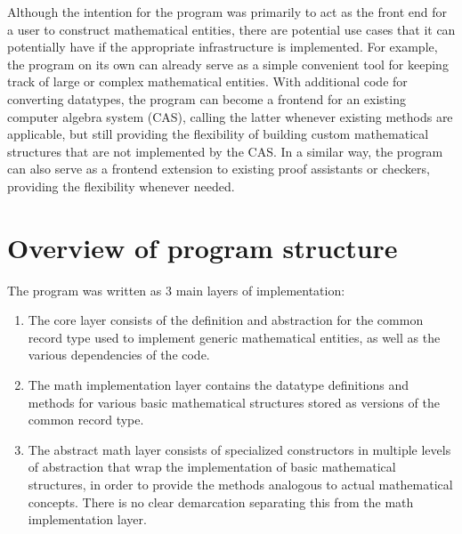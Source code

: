 \documentclass{article}
\begin{document}
        Although the intention for the program was primarily to act as the front end for a user to construct mathematical entities, there are potential use cases that it can potentially have if the appropriate infrastructure is implemented. For example, the program on its own can already serve as a simple convenient tool for keeping track of large or complex mathematical entities. With additional code for converting datatypes, the program can become a frontend for an existing computer algebra system (CAS), calling the latter whenever existing methods are applicable, but still providing the flexibility of building custom mathematical structures that are not implemented by the CAS. In a similar way, the program can also serve as a frontend extension to existing proof assistants or checkers, providing the flexibility whenever needed.
    
    
    \section{Overview of program structure}
        
        The program was written as 3 main layers of implementation:
        \begin{enumerate}[1.]
            \item The core layer consists of the definition and abstraction for the common record type used to implement generic mathematical entities, as well as the various dependencies of the code.
            \item The math implementation layer contains the datatype definitions and methods for various basic mathematical structures stored as versions of the common record type.
            \item The abstract math layer consists of specialized constructors in multiple levels of abstraction that wrap the implementation of basic mathematical structures, in order to provide the methods analogous to actual mathematical concepts. There is no clear demarcation separating this from the math implementation layer.
        \end{enumerate}
        
\end{document}
